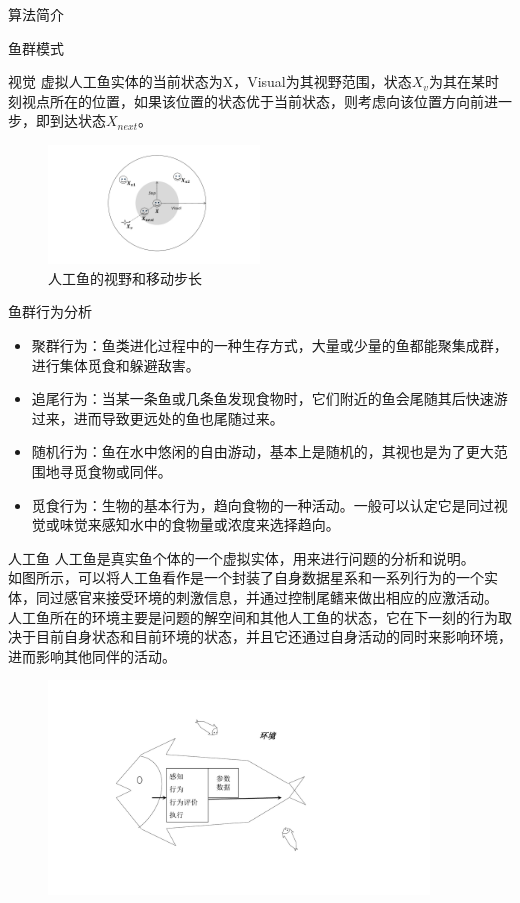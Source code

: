 \documentclass[a4paper, 11pt]{article}
\begin{document}
\begin{section}
{算法简介}
	\begin{subsection}
	{鱼群模式}
		\begin{subsubsection}
		{视觉}	虚拟人工鱼实体的当前状态为X，Visual为其视野范围，状态$X_v$为其在某时刻视点所在的位置，如果该位置的状态优于当前状态，则考虑向该位置方向前进一步，即到达状态$X_{next}。$
		\begin{figure}[htbp]
			\centering
			\includegraphics[width=0.5\textwidth]{../../pic/fish1.pdf}
			\caption{人工鱼的视野和移动步长}
		\end{figure}
		\end{subsubsection}
		\begin{subsubsection}
		{鱼群行为分析}
		\begin{itemize}
			\item{聚群行为：鱼类进化过程中的一种生存方式，大量或少量的鱼都能聚集成群，进行集体觅食和躲避敌害。}
			\item{追尾行为：当某一条鱼或几条鱼发现食物时，它们附近的鱼会尾随其后快速游过来，进而导致更远处的鱼也尾随过来。}
			\item{随机行为：鱼在水中悠闲的自由游动，基本上是随机的，其视也是为了更大范围地寻觅食物或同伴。}
			\item{觅食行为：生物的基本行为，趋向食物的一种活动。一般可以认定它是同过视觉或味觉来感知水中的食物量或浓度来选择趋向。}
		\end{itemize}
		\end{subsubsection}
		\begin{subsubsection}
		{人工鱼}		人工鱼是真实鱼个体的一个虚拟实体，用来进行问题的分析和说明。\\如图所示，可以将人工鱼看作是一个封装了自身数据星系和一系列行为的一个实体，同过感官来接受环境的刺激信息，并通过控制尾鳍来做出相应的应激活动。\\人工鱼所在的环境主要是问题的解空间和其他人工鱼的状态，它在下一刻的行为取决于目前自身状态和目前环境的状态，并且它还通过自身活动的同时来影响环境，进而影响其他同伴的活动。
		\begin{figure}[htbp]
			\centering
			\includegraphics[width=0.9\textwidth]{../../pic/fish2.pdf}

\end{figure}
\end{subsubsection}
\end{subsection}
\end{section}
\end{document}
